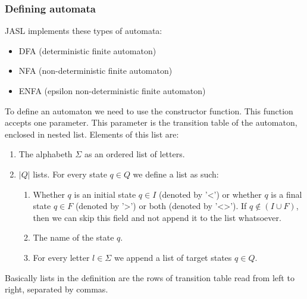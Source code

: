 \documentclass{ctuthesis}
\begin{document}
\subsubsection{Defining automata}
JASL implements these types of automata:

\begin{itemize}
	\item DFA (deterministic finite automaton)
	\item NFA (non-deterministic finite automaton)
	\item ENFA (epsilon non-deterministic finite automaton)
\end{itemize}

To define an automaton we need to use the constructor function. This function accepts one parameter. This parameter is the transition table of the automaton, enclosed in nested list. Elements of this list are:

\begin{enumerate}
	\item The alphabeth $\Sigma$ as an ordered list of letters.
	\item $|Q|$ lists. For every state $q \in Q$ we define a list as such:
		\begin{enumerate}
			\item Whether $q$ is an initial state $q \in I$ (denoted by '<') or whether $q$ is a final state $q \in F$ (denoted by '>') or both (denoted by '<>'). If $q \not \in (I \cup F)$, then we can skip this field and not append it to the list whatsoever.
			\item The name of the state $q$.
			\item For every letter $l \in \Sigma$ we append a list of target states $q \in Q$.
		\end{enumerate}
\end{enumerate}

Basically lists in the definition are the rows of transition table read from left to right, separated by commas.
\end{document}
